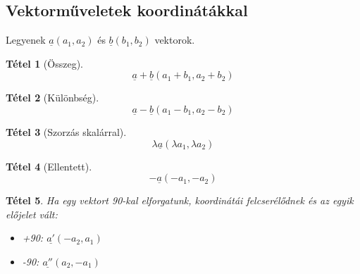 \documentclass[twoside,12pt]{report}
\renewcommand{\vec}{\underline}
\newtheorem{theorem}{Tétel}[section]
\theoremstyle{definition}
\begin{document}
	\subsection{Vektorműveletek koordinátákkal}
	Legyenek $\vec{a}(a_1,a_2)$ és $\vec{b}(b_1,b_2)$ vektorok.
	\begin{theorem}[Összeg]
		\begin{equation*}
			\vec{a}+\vec{b}(a_1+b_1,a_2+b_2)
		\end{equation*}
	\end{theorem}
	\begin{theorem}[Különbség]
		\begin{equation*}
		\vec{a}-\vec{b}(a_1-b_1,a_2-b_2)
		\end{equation*}
	\end{theorem}
	\begin{theorem}[Szorzás skalárral]
		\begin{equation*}
			\lambda\vec{a}(\lambda a_1,\lambda a_2)
		\end{equation*}
	\end{theorem}
	\begin{theorem}[Ellentett]
		\begin{equation*}
			-\vec{a}(-a_1,-a_2)
		\end{equation*}
	\end{theorem}
	\begin{theorem}
		Ha egy vektort 90\degree-kal elforgatunk, koordinátái felcserélődnek és az egyik előjelet vált:
		\begin{itemize}
			\item +90\degree: $\vec{a'}(-a_2,a_1)$
			\item -90\degree: $\vec{a''}(a_2,-a_1)$
		\end{itemize}
	\end{theorem}
\end{document}
